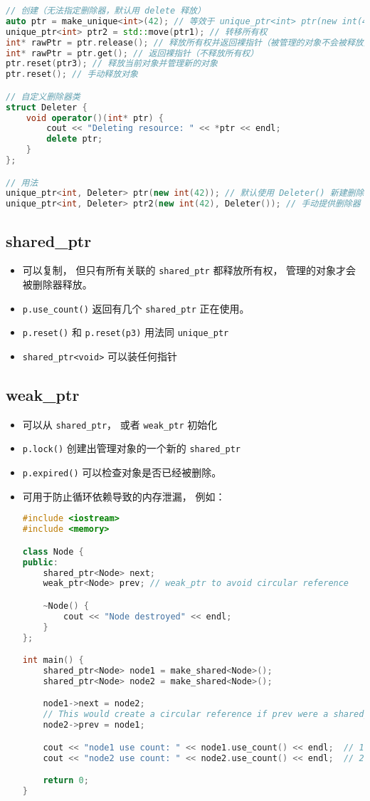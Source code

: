 \begin{lstlisting}[language=cpp]
// 创建（无法指定删除器，默认用 delete 释放）
auto ptr = make_unique<int>(42); // 等效于 unique_ptr<int> ptr(new int(42));
unique_ptr<int> ptr2 = std::move(ptr1); // 转移所有权
int* rawPtr = ptr.release(); // 释放所有权并返回裸指针（被管理的对象不会被释放）
int* rawPtr = ptr.get(); // 返回裸指针（不释放所有权）
ptr.reset(ptr3); // 释放当前对象并管理新的对象
ptr.reset(); // 手动释放对象

// 自定义删除器类
struct Deleter {
    void operator()(int* ptr) {
        cout << "Deleting resource: " << *ptr << endl;
        delete ptr;
    }
};

// 用法
unique_ptr<int, Deleter> ptr(new int(42)); // 默认使用 Deleter() 新建删除器
unique_ptr<int, Deleter> ptr2(new int(42), Deleter()); // 手动提供删除器
\end{lstlisting}


\subsection{shared\_ptr}
\begin{itemize}
\item 可以复制， 但只有所有关联的 \verb`shared_ptr` 都释放所有权， 管理的对象才会被删除器释放。
\item \verb`p.use_count()` 返回有几个 \verb`shared_ptr` 正在使用。
\item \verb`p.reset()` 和 \verb`p.reset(p3)` 用法同 \verb`unique_ptr`
\item \verb`shared_ptr<void>` 可以装任何指针
\end{itemize}

\subsection{weak\_ptr}
\begin{itemize}
\item 可以从 \verb`shared_ptr`， 或者 \verb`weak_ptr` 初始化
\item \verb`p.lock()` 创建出管理对象的一个新的 \verb`shared_ptr`
\item \verb`p.expired()` 可以检查对象是否已经被删除。
\item 可用于防止循环依赖导致的内存泄漏， 例如：
\begin{lstlisting}[language=cpp]
#include <iostream>
#include <memory>

class Node {
public:
    shared_ptr<Node> next;
    weak_ptr<Node> prev; // weak_ptr to avoid circular reference

    ~Node() {
        cout << "Node destroyed" << endl;
    }
};

int main() {
    shared_ptr<Node> node1 = make_shared<Node>();
    shared_ptr<Node> node2 = make_shared<Node>();

    node1->next = node2;
    // This would create a circular reference if prev were a shared_ptr
    node2->prev = node1;

    cout << "node1 use count: " << node1.use_count() << endl;  // 1
    cout << "node2 use count: " << node2.use_count() << endl;  // 2

    return 0;
}
\end{lstlisting}
\end{itemize}
